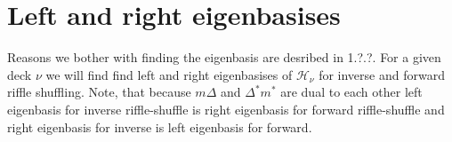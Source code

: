 \documentclass[a4paper, 12pt]{report}
\begin{document}
\chapter{Left and right eigenbasises}

Reasons we bother with finding the eigenbasis are desribed in 1.?.?. For a given deck $\nu$
we will find find left and right eigenbasises of $\mathcal{H}_\nu$ for inverse and forward riffle shuffling.
Note, that because
$m\Delta$ and $\Delta^*m^*$ are dual to each other left eigenbasis for inverse riffle-shuffle is right
eigenbasis for forward riffle-shuffle and right eigenbasis for inverse is left eigenbasis for forward.
\end{document}
